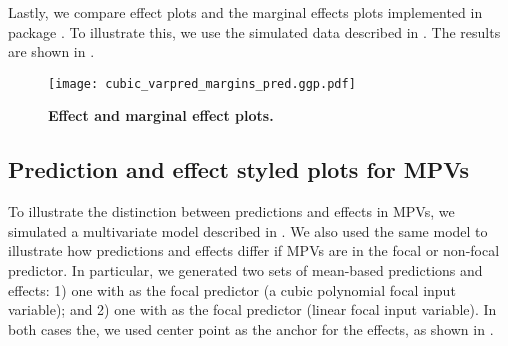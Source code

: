 Lastly, we compare effect plots and the marginal effects \citep{leeper2017interpreting} plots implemented in package  \citep{lenth2018package}. To illustrate this, we use the simulated data described in . The results are shown in .
%
\begin{figure}
\centering
\texttt{[image: cubic\_varpred\_margins\_pred.ggp.pdf]}
\caption{{\bf Effect and marginal effect plots.} }
\label{fig:qoi_age_pred_plot}
\end{figure}
%


\subsection{Prediction and effect styled plots for MPVs}

To illustrate the distinction between predictions and effects in MPVs, we simulated a multivariate model described in . We also used the same model to illustrate how predictions and effects differ if MPVs are in the focal or non-focal predictor. In particular, we generated two sets of mean-based predictions and effects: 1) one with  as the focal predictor (a cubic polynomial focal input variable); and 2) one with  as the focal predictor (linear focal input variable). In both cases the, we used center point as the anchor for the effects, as shown in .

